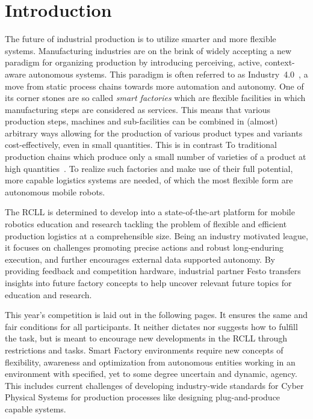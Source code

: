 \documentclass[12pt,twoside]{article}
\begin{document}
\setcounter{page}{1}

\section{Introduction}
\label{sec:intro}
The future of industrial production is to utilize smarter and more flexible
systems. Manufacturing industries are on the brink of
widely accepting a new paradigm for organizing production by introducing
perceiving, active, context-aware autonomous systems. This paradigm is
often referred to as Industry~4.0~\cite{Industry-4.0}, a move from static
process chains towards more automation and autonomy. One of its corner stones
are so called \emph{smart factories} which are flexible facilities in which
manufacturing steps are considered as services. This means that various
production steps, machines and sub-facilities can be combined in (almost)
arbitrary ways allowing for the production of various product types and
variants cost-effectively, even in small quantities. This is in contrast To
traditional production chains which produce only a small number of varieties
of a product at high quantities~\cite{RCLL-CPS}. To realize such factories
and make use of their full potential, more capable logistics systems are needed,
of which the most flexible form are autonomous mobile robots.

The \ac{RCLL} is determined to develop into a
state-of-the-art platform for mobile robotics education and research
tackling the problem of flexible and efficient production logistics at a
comprehensible size. Being an industry motivated league, it focuses
on challenges promoting precise actions and robust long-enduring
execution, and further encourages external data supported
autonomy. By providing feedback and competition hardware, industrial
partner Festo transfers insights into future factory concepts to help
 uncover relevant future topics for education and research.

 This year's competition is laid out in the following pages.  It ensures
 the same and fair conditions for all participants. It neither
 dictates nor suggests how to fulfill the task, but is meant
 to encourage new developments in the \ac{RCLL} through restrictions
 and tasks. Smart Factory environments require new
 concepts of flexibility, awareness and optimization from autonomous
 entities working in an environment with specified, yet to some degree
 uncertain and dynamic, agency. This includes current challenges of
 developing industry-wide standards for Cyber Physical Systems for
 production processes like designing plug-and-produce capable
 systems.
\end{document}
